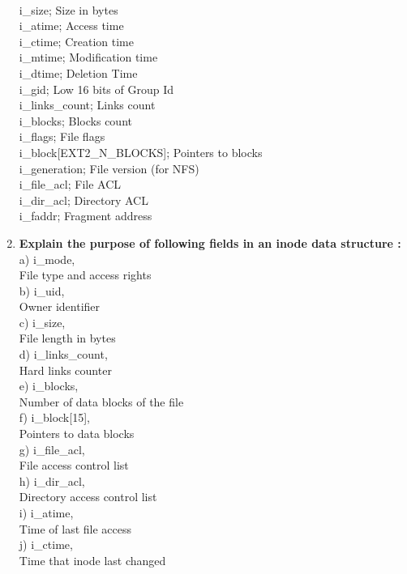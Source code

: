 \documentclass[a4paper,12pt]{article}
\begin{document}
\begin{flushleft}
\begin{enumerate}
{	\\	i\_size;		 Size in bytes 
	\\	i\_atime;	 Access time 
	\\	i\_ctime;	 Creation time 
	\\	i\_mtime;	 Modification time 
	\\	i\_dtime;	 Deletion Time 
	\\	i\_gid;		 Low 16 bits of Group Id 
	\\	i\_links\_count;	 Links count 
	\\	i\_blocks;	 Blocks count 
	\\	i\_flags;	 File flags 
	\\	i\_block[EXT2\_N\_BLOCKS];  Pointers to blocks 
	\\	i\_generation;	  File version (for NFS) 
	\\	i\_file\_acl;	  File ACL 
	\\	i\_dir\_acl;	  Directory ACL 
	\\	i\_faddr;	  Fragment address }\\
\item \textbf{ Explain the purpose of following fields in an inode data structure :}\\
a) i\_mode,\\
 {\color{red}File type and access rights}\\
b) i\_uid, \\
{\color{red}Owner identifier}\\
 c) i\_size, \\
{\color{red}File length in bytes}\\
 d) i\_links\_count,\\
{\color{red}Hard links counter}\\
e) i\_blocks, \\
{\color{red}Number of data blocks of the file}\\
f) i\_block[15], \\
{\color{red}Pointers to data blocks}\\
g) i\_file\_acl, \\
{\color{red}File access control list}\\
h) i\_dir\_acl, \\
{\color{red}Directory access control list}\\
i) i\_atime,\\
{\color{red}Time of last file access}\\
j) i\_ctime, \\
{\color{red}Time that inode last changed}\\

\end{enumerate}
\end{flushleft}
\end{document}
